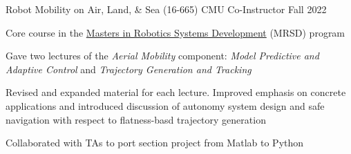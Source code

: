 
\begin{cventries}
  \cventry
  {Robot Mobility on Air, Land, \& Sea (16-665)}
  {CMU}
  {Co-Instructor}
  {Fall 2022}
  {
    \begin{cvitems}
      \item Core course in the \href{https://mrsd.ri.cmu.edu/}{Masters in
        Robotics Systems Development} (MRSD) program
      \item Gave two lectures of the \emph{Aerial Mobility} component:
        \emph{Model Predictive and Adaptive Control}
        and
        \emph{Trajectory Generation and Tracking}
      \item Revised and expanded material for each lecture.
        Improved emphasis on concrete applications and introduced discussion of
        autonomy system design and safe navigation with respect to flatness-basd
        trajectory generation
      \item Collaborated with TAs to port section project from Matlab to Python
    \end{cvitems}
  }
\end{cventries}

